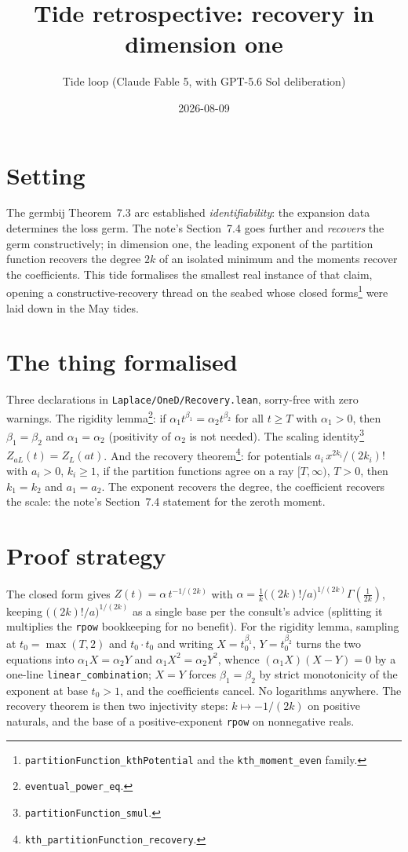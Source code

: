 \documentclass[11pt]{article}
\title{Tide retrospective: recovery in dimension one}
\author{Tide loop (Claude Fable 5, with GPT-5.6 Sol deliberation)}
\date{2026-08-09}
\begin{document}
\maketitle

\section{Setting}

The germbij Theorem~7.3 arc established \emph{identifiability}: the
expansion data determines the loss germ. The note's Section~7.4 goes
further and \emph{recovers} the germ constructively; in dimension one,
the leading exponent of the partition function recovers the degree $2k$
of an isolated minimum and the moments recover the coefficients. This
tide formalises the smallest real instance of that claim, opening a
constructive-recovery thread on the seabed whose closed
forms\footnote{\texttt{partitionFunction\_kthPotential} and the
\texttt{kth\_moment\_even} family.} were laid down in the May tides.

\section{The thing formalised}

Three declarations in \texttt{Laplace/OneD/Recovery.lean}, sorry-free
with zero warnings. The rigidity lemma\footnote{\texttt{eventual\_power\_eq}.}:
if $\alpha_1 t^{\beta_1} = \alpha_2 t^{\beta_2}$ for all $t \geq T$ with
$\alpha_1 > 0$, then $\beta_1 = \beta_2$ and $\alpha_1 = \alpha_2$
(positivity of $\alpha_2$ is not needed). The scaling
identity\footnote{\texttt{partitionFunction\_smul}.}
$Z_{aL}(t) = Z_L(at)$. And the recovery
theorem\footnote{\texttt{kth\_partitionFunction\_recovery}.}: for
potentials $a_i\, x^{2k_i}/(2k_i)!$ with $a_i > 0$, $k_i \geq 1$, if the
partition functions agree on a ray $[T, \infty)$, $T > 0$, then
$k_1 = k_2$ and $a_1 = a_2$. The exponent recovers the degree, the
coefficient recovers the scale: the note's Section~7.4 statement for the
zeroth moment.

\section{Proof strategy}

The closed form gives $Z(t) = \alpha\, t^{-1/(2k)}$ with
$\alpha = \frac{1}{k}\bigl((2k)!/a\bigr)^{1/(2k)}\Gamma(\tfrac{1}{2k})$,
keeping $\bigl((2k)!/a\bigr)^{1/(2k)}$ as a single base per the consult's
advice (splitting it multiplies the \texttt{rpow} bookkeeping for no
benefit). For the rigidity lemma, sampling at $t_0 = \max(T, 2)$ and
$t_0 \cdot t_0$ and writing $X = t_0^{\beta_1}$, $Y = t_0^{\beta_2}$
turns the two equations into $\alpha_1 X = \alpha_2 Y$ and
$\alpha_1 X^2 = \alpha_2 Y^2$, whence
$(\alpha_1 X)(X - Y) = 0$ by a one-line
\texttt{linear\_combination}; $X = Y$ forces $\beta_1 = \beta_2$ by
strict monotonicity of the exponent at base $t_0 > 1$, and the
coefficients cancel. No logarithms anywhere. The recovery theorem is
then two injectivity steps: $k \mapsto -1/(2k)$ on positive naturals,
and the base of a positive-exponent \texttt{rpow} on nonnegative reals.
\end{document}
